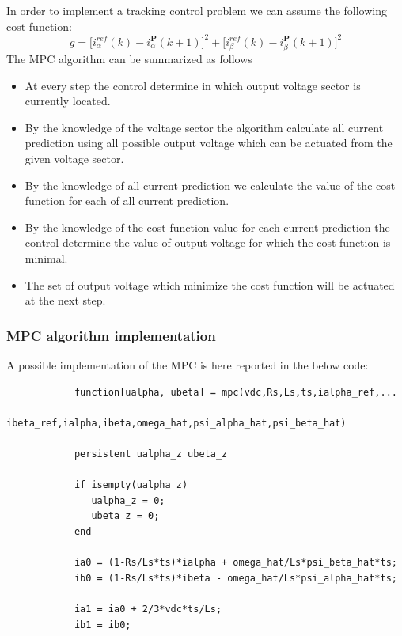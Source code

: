 \documentclass[12pt,a4paper,oneside]{book}
\begin{document}
\begin{onehalfspace}
In order to implement a tracking control problem we can assume the following cost function:
\begin{equation}
	g=\Big[i_\alpha^{ref}(k) - i_\alpha^{\mathbf{P}}(k+1)\Big]^2+ 
	\Big[i_\beta^{ref}(k) -i_\beta^{\mathbf{P}}(k+1)\Big]^2
\end{equation}
The MPC algorithm can be summarized as follows
\begin{itemize}
	\item[--] At every step the control determine in which output voltage sector is currently located. 
	\item[--] By the knowledge of the voltage sector the algorithm calculate all current prediction using all possible output voltage which can be actuated from the given voltage sector.
	\item[--] By the knowledge of all current prediction we calculate the value of the cost function for each of all current prediction.
	\item[--] By the knowledge of the cost function value for each current prediction the control determine the value of output voltage for which the cost function is minimal.
	\item[--] The set of output voltage which minimize the cost function will be actuated at the next step.
\end{itemize}

\subsubsection{MPC algorithm implementation}
A possible implementation of the MPC is here reported in the below code:
\begin{mybox}
	{\selectfont \footnotesize \noindent
		\begin{verbatim}
			function[ualpha, ubeta] = mpc(vdc,Rs,Ls,ts,ialpha_ref,...
			                    ibeta_ref,ialpha,ibeta,omega_hat,psi_alpha_hat,psi_beta_hat)
			
			persistent ualpha_z ubeta_z
			
			if isempty(ualpha_z)
			   ualpha_z = 0;
			   ubeta_z = 0;
			end
			
			ia0 = (1-Rs/Ls*ts)*ialpha + omega_hat/Ls*psi_beta_hat*ts;
			ib0 = (1-Rs/Ls*ts)*ibeta - omega_hat/Ls*psi_alpha_hat*ts;
			
			ia1 = ia0 + 2/3*vdc*ts/Ls;
			ib1 = ib0;
			

\end{verbatim}}
\end{mybox}
\end{onehalfspace}
\end{document}
